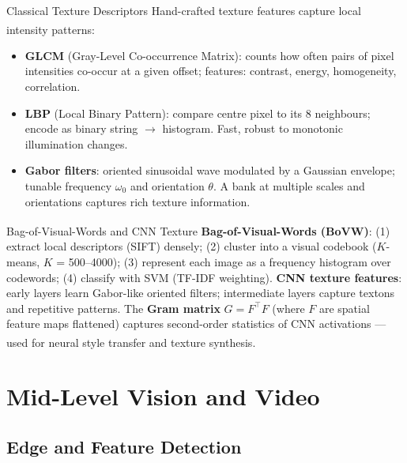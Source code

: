 \begin{v3topic}{Classical Texture Descriptors}
    Hand-crafted texture features capture local intensity patterns\textsuperscript{\cite[][pp.~645--662]{szeliski2022}}:
    \begin{itemize}
        \item \textbf{GLCM} (Gray-Level Co-occurrence Matrix): counts how often pairs of pixel intensities co-occur at a given offset; features: contrast, energy, homogeneity, correlation.
        \item \textbf{LBP} (Local Binary Pattern): compare centre pixel to its 8 neighbours; encode as binary string $\to$ histogram. Fast, robust to monotonic illumination changes.
        \item \textbf{Gabor filters}: oriented sinusoidal wave modulated by a Gaussian envelope; tunable frequency $\omega_0$ and orientation $\theta$. A bank at multiple scales and orientations captures rich texture information.
    \end{itemize}

\end{v3topic}
\begin{v3topic}{Bag-of-Visual-Words and CNN Texture}
    \textbf{Bag-of-Visual-Words (BoVW)}\textsuperscript{\cite[][pp.~682--686]{szeliski2022}}: (1) extract local descriptors (SIFT) densely; (2) cluster into a visual codebook ($K$-means, $K$ = 500–4000); (3) represent each image as a frequency histogram over codewords; (4) classify with SVM (TF-IDF weighting).
\visualseparator
    \textbf{CNN texture features}: early layers learn Gabor-like oriented filters; intermediate layers capture textons and repetitive patterns.
    The \textbf{Gram matrix} $G = F^\top F$ (where $F$ are spatial feature maps flattened) captures second-order statistics of CNN activations --- used for neural style transfer and texture synthesis\textsuperscript{\cite[][p.~119]{fleuretLittleBookDeep}}.
\end{v3topic}


\section{Mid-Level Vision and Video}

\subsection{Edge and Feature Detection}

